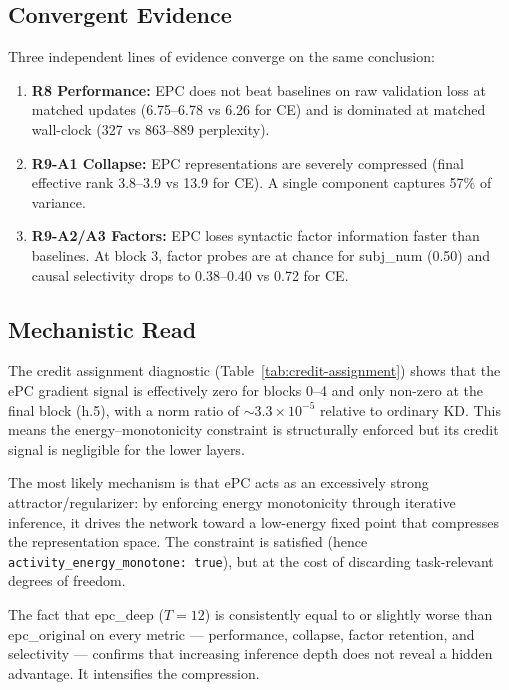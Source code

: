 \documentclass[11pt,a4paper]{article}
\begin{document}
\subsection{Convergent Evidence}

Three independent lines of evidence converge on the same conclusion:

\begin{enumerate}
  \item \textbf{R8 Performance:} EPC does not beat baselines on raw
    validation loss at matched updates (6.75--6.78 vs 6.26 for CE)
    and is dominated at matched wall-clock (327 vs 863--889 perplexity).

  \item \textbf{R9-A1 Collapse:} EPC representations are severely
    compressed (final effective rank 3.8--3.9 vs 13.9 for CE).  A
    single component captures 57\% of variance.

  \item \textbf{R9-A2/A3 Factors:} EPC loses syntactic factor
    information faster than baselines.  At block 3, factor probes are
    at chance for subj\_num (0.50) and causal selectivity drops to
    0.38--0.40 vs 0.72 for CE.
\end{enumerate}

\subsection{Mechanistic Read}

The credit assignment diagnostic (Table~\ref{tab:credit-assignment})
shows that the ePC gradient signal is effectively zero for blocks 0--4
and only non-zero at the final block (h.5), with a norm ratio of
$\sim$$3.3 \times 10^{-5}$ relative to ordinary KD.  This means the
energy--monotonicity constraint is structurally enforced but its
credit signal is negligible for the lower layers.

The most likely mechanism is that ePC acts as an excessively strong
attractor/regularizer: by enforcing energy monotonicity through
iterative inference, it drives the network toward a low-energy
fixed point that compresses the representation space.  The constraint
is satisfied (hence \texttt{activity\_energy\_monotone: true}), but at
the cost of discarding task-relevant degrees of freedom.

The fact that epc\_deep ($T{=}12$) is consistently equal to or
slightly worse than epc\_original on every metric --- performance,
collapse, factor retention, and selectivity --- confirms that
increasing inference depth does not reveal a hidden advantage.  It
intensifies the compression.
\end{document}
